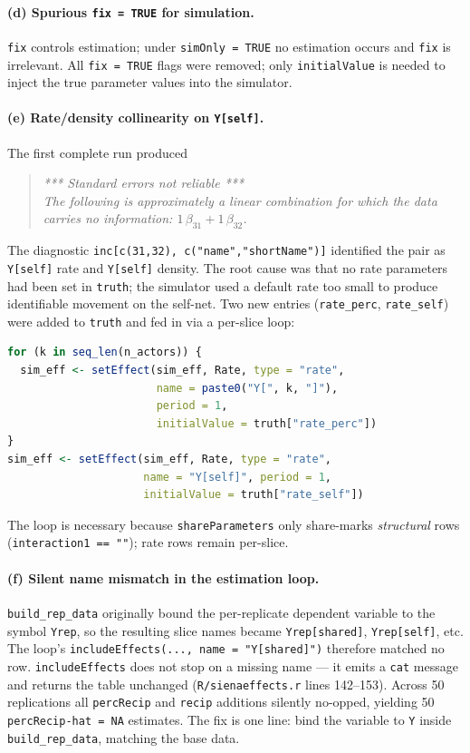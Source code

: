 \documentclass[11pt]{article}
\newcommand{\file}[1]{\texttt{#1}}
\begin{document}
\paragraph{(d) Spurious \texttt{fix = TRUE} for simulation.}
\texttt{fix} controls estimation; under \texttt{simOnly = TRUE} no
estimation occurs and \texttt{fix} is irrelevant.  All \texttt{fix =
TRUE} flags were removed; only \texttt{initialValue} is needed to
inject the true parameter values into the simulator.

\paragraph{(e) Rate/density collinearity on \texttt{Y[self]}.}
\label{sec:rates}
The first complete run produced
\begin{quote}\itshape
\textsf{*** Standard errors not reliable *** \\
The following is approximately a linear combination for which the data
carries no information: $1\,\beta_{31} + 1\,\beta_{32}$.}
\end{quote}
The diagnostic \texttt{inc[c(31,32), c("name","shortName")]} identified
the pair as \texttt{Y[self]} rate and \texttt{Y[self]} density.  The
root cause was that no rate parameters had been set in \texttt{truth};
the simulator used a default rate too small to produce identifiable
movement on the self-net.  Two new entries
(\texttt{rate\_perc}, \texttt{rate\_self}) were added to \texttt{truth}
and fed in via a per-slice loop:
\begin{lstlisting}[language=R]
for (k in seq_len(n_actors)) {
  sim_eff <- setEffect(sim_eff, Rate, type = "rate",
                       name = paste0("Y[", k, "]"),
                       period = 1,
                       initialValue = truth["rate_perc"])
}
sim_eff <- setEffect(sim_eff, Rate, type = "rate",
                     name = "Y[self]", period = 1,
                     initialValue = truth["rate_self"])
\end{lstlisting}
The loop is necessary because \texttt{shareParameters} only
share-marks \emph{structural} rows (\texttt{interaction1 == ""}); rate
rows remain per-slice.

\paragraph{(f) Silent name mismatch in the estimation loop.}
\texttt{build\_rep\_data} originally bound the per-replicate dependent
variable to the symbol \texttt{Yrep}, so the resulting slice names
became \texttt{Yrep[shared]}, \texttt{Yrep[self]}, etc.  The loop's
\verb|includeEffects(..., name = "Y[shared]")| therefore matched no
row.  \texttt{includeEffects} does not stop on a missing name --- it
emits a \texttt{cat} message and returns the table unchanged
(\file{R/sienaeffects.r} lines 142--153).  Across 50 replications all
\texttt{percRecip} and \texttt{recip} additions silently no-opped,
yielding 50 \texttt{percRecip-hat = NA} estimates.  The fix is one
line: bind the variable to \texttt{Y} inside \texttt{build\_rep\_data},
matching the base data.
\end{document}
